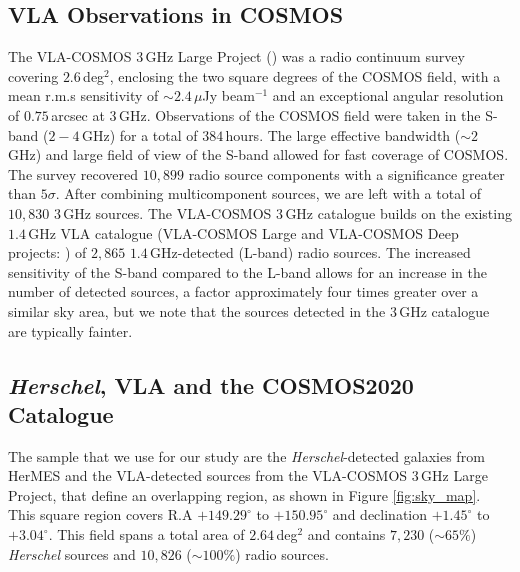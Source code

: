 \subsection{VLA Observations in COSMOS}

The VLA-COSMOS $3\,$GHz Large Project (\citealt{Smolcic_2017a, Smolcic_2017b, Smolcic_2017c}) was a radio continuum survey covering $2.6\,$deg$^{2}$, enclosing the two square degrees of the COSMOS field, with a mean r.m.s sensitivity of $\sim 2.4\,\mu$Jy beam$^{-1}$ and an exceptional angular resolution of $0.75\,$arcsec at $3\,$GHz. Observations of the COSMOS field were taken in the S-band ($2 - 4\,$GHz) for a total of $384\,$hours. The large effective bandwidth ($\sim 2\,$GHz) and large field of view of the S-band allowed for fast coverage of COSMOS. The survey recovered $10,899$ radio source components with a significance greater than $5\sigma$. After combining multicomponent sources, we are left with a total of $10,830$ $3\,$GHz sources. The VLA-COSMOS $3\,$GHz catalogue builds on the existing $1.4\,$GHz VLA catalogue (VLA-COSMOS Large and VLA-COSMOS Deep projects: \citealt{Schinnerer_2004, Schinnerer_2007, Schinnerer_2010}) of $2,865$ $1.4\,$GHz-detected (L-band) radio sources. The increased sensitivity of the S-band compared to the L-band allows for an increase in the number of detected sources, a factor approximately four times greater over a similar sky area, but we note that the sources detected in the $3\,$GHz catalogue are typically fainter.

\subsection{\textit{Herschel}, VLA and the COSMOS2020 Catalogue}

The sample that we use for our study are the \textit{Herschel}-detected galaxies from HerMES and the VLA-detected sources from the VLA-COSMOS $3\,$GHz Large Project, that define an overlapping region, as shown in Figure \ref{fig:sky_map}. This square region covers R.A  $+149.29^{\circ}$ to $+150.95^{\circ}$ and declination $+1.45^{\circ}$ to $+3.04^{\circ}$. This field spans a total area of $2.64\,$deg$^2$ and contains $7,230$ ($\sim 65\%$) \textit{Herschel} sources and $10,826$ ($\sim 100\%$) radio sources.

